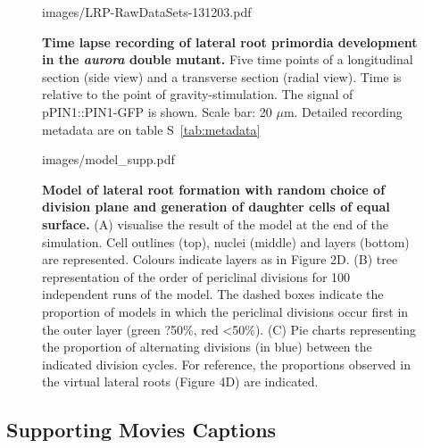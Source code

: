 \documentclass[11pt,a4paper, draft]{article}
\begin{document}
%
\begin{figure}[htbp]
	\begin{overpic}[width=1.\linewidth]{images/LRP-RawDataSets-131203.pdf}
	\end{overpic}
\caption[ Time lapse recording of  lateral root primordia development in the \emph{aurora} double mutant.]
{{\bf Time lapse recording of  lateral root primordia development in the \emph{aurora} double mutant.} Five time points of a longitudinal section (side view) and a transverse section (radial view). Time is relative to the point of gravity-stimulation. The signal of pPIN1::PIN1-GFP  is shown. Scale bar: 20 $\mu$m. Detailed recording metadata are on table S~\ref{tab:metadata}}
\label{fig:aurora}
\end{figure}
%
\clearpage
%
\begin{figure}[htbp]
	\begin{overpic}[width=1.\linewidth]{images/model_supp.pdf}
	\end{overpic}
\caption[Model of lateral root formation with random choice of division plane and  generation of  daughter cells of equal surface.]
{{\bf Model of lateral root formation with random choice of division plane and  generation of  daughter cells of equal surface.} (A) visualise the result of the model at the end of the simulation. Cell outlines (top), nuclei (middle) and layers (bottom) are represented. Colours indicate layers as in Figure 2D. (B)  tree representation of the order of periclinal divisions for 100 independent runs of the model. The dashed boxes indicate the proportion of models in which the periclinal divisions occur first in the outer layer (green ?50\%, red <50\%). (C) Pie charts representing the proportion of alternating divisions (in blue) between the indicated division cycles. For reference, the proportions observed in the virtual lateral roots (Figure 4D) are indicated. }
\label{fig:modelrandea}
\end{figure}
%
\clearpage
%
\subsection{Supporting Movies Captions}
\setcounter{figure}{0}
\renewcommand{\figurename}{Movie}
\end{document}
